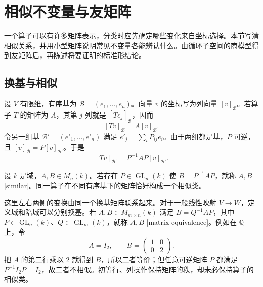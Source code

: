 
\section{相似不变量与友矩阵}
\label{b2:sec:0104}

一个算子可以有许多矩阵表示，分类时应先确定哪些变化来自坐标选择。本节写清相似关系，并用小型矩阵说明常见不变量各能辨认什么。由循环子空间的商模型得到友矩阵后，再陈述将要证明的标准形结论。

%
%
%

\subsection{换基与相似}
\label{b2:subsec:0104:01}

设 \(V\) 有限维，有序基为 \(\mathcal B=(e_1,\ldots,e_n)\)。向量 \(v\) 的坐标写为列向量 \([v]_{\mathcal B}\)。若算子 \(T\) 的矩阵为 \(A\)，其第 \(j\) 列就是 \([Te_j]_{\mathcal B}\)，因而
\[
	[Tv]_{\mathcal B}=A[v]_{\mathcal B}.
\]
令另一组基 \(\mathcal B'=(e'_1,\ldots,e'_n)\) 满足 \(e'_j=\sum_iP_{ij}e_i\)。由于两组都是基，\(P\) 可逆，且 \([v]_{\mathcal B}=P[v]_{\mathcal B'}\)。于是
\[
	[Tv]_{\mathcal B'}=P^{-1}AP[v]_{\mathcal B'}.
\]

\begin{definition}\label{b2:def:matrix-similarity}
	设 \(k\) 是域，\(A,B\in M_n(k)\)。若存在 \(P\in\operatorname{GL}_n(k)\) 使 \(B=P^{-1}AP\)，就称 \(A,B\) [similar]。同一算子在不同有序基下的矩阵恰好构成一个相似类。
\end{definition}

这里左右两侧的变换由同一个换基矩阵联系起来。对于一般线性映射 \(V\to W\)，定义域和陪域可以分别换基。若 \(A,B\in M_{m\times n}(k)\) 满足 \(B=Q^{-1}AP\)，其中 \(P\in\operatorname{GL}_n(k)\)、\(Q\in\operatorname{GL}_m(k)\)，就称 \(A,B\) [matrix equivalence]。例如在 \(\mathbb Q\) 上，令
\[
	A=I_2,\qquad B=\begin{pmatrix}1&0\\0&2\end{pmatrix}.
\]
把 \(A\) 的第二行乘以 \(2\) 就得到 \(B\)，所以二者等价；但任意可逆矩阵 \(P\) 都满足 \(P^{-1}I_2P=I_2\)，故二者不相似。初等行、列操作保持矩阵的秩，却未必保持算子的相似类。

